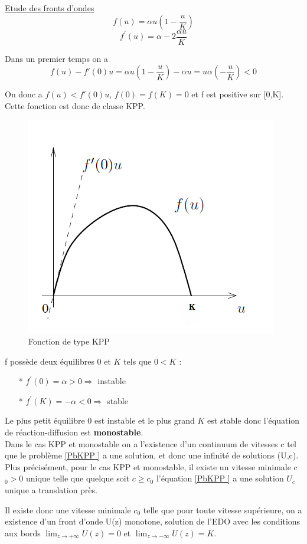 \documentclass[a4paper,11pt]{article}
\begin{document}
\underline{Etude des fronts d'ondes}\\
$$f(u)= \alpha u (1 - \dfrac{u}{K})$$
$$f^\prime(u)= \alpha - 2 \frac{\alpha u}{K}$$


Dans un premier temps on a $$ f(u) - f'(0)u = \alpha u (1 - \dfrac{u}{K}) - \alpha u = u\alpha (- \dfrac{u}{K}) < 0$$

On donc a  $f(u) < f'(0)u$, $f(0) = f(K) = 0$ et f est positive sur [0,K]. Cette fonction est donc de classe KPP.

\begin{figure}[H]
	\centering
	\includegraphics[width=0.40\linewidth]{SimulationKPP/fu}\hfill
	\caption{Fonction de type KPP}
\end{figure}


f possède deux équilibres $0$ et $K$ tels que $0 < K$ :\\
	\begin{itemize}
    	\item[*] $f^\prime(0)= \alpha >0 \Rightarrow $ instable
        \item[*] $f^\prime(K)= -\alpha <0 \Rightarrow $ stable\\
	\end{itemize}
    
    
    Le plus petit équilibre $0$ est instable et le plus grand $K$ est stable donc l'équation de réaction-diffusion est \textbf{monostable}. \\

Dans le cas KPP et monostable on a l'existence d'un continuum de vitesses c tel que le problème \ref{PbKPP } a une solution, et donc une infinité de solutions (U,c). Plus précisément, pour le cas KPP et monostable, il existe un vitesse minimale c$_0 >0$ unique telle que quelque soit $c  \geqslant c_0$ l'équation \ref{PbKPP } a une solution $U_c$ unique a translation près.

    Il existe donc une vitesse minimale $c_0$ telle que pour toute vitesse supérieure, on a existence d'un front d'onde U(z) monotone, solution de l'EDO avec les conditions aux bords $\lim_{z \to +\infty} U(z)=0$ et $\lim_{z \to -\infty} U(z)=K$. \\
    
\end{document}
